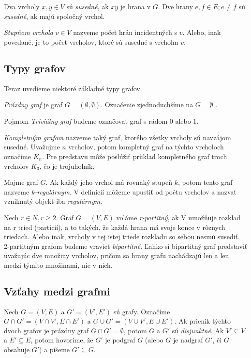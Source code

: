 Dva vrcholy $x, y \in V$ sú  \textit{susedné}, ak $xy$ je hrana v $G$.
Dve hrany $e, f \in E; e \neq f$ sú  \textit{susedné}, ak majú spoločný vrchol.\newline

\textit{Stupňom vrchola} $v \in V$ nazveme počet hrán incidentných s $v$. Alebo, inak povedané, je to počet vrcholov, ktoré sú susedné s vrcholm $v$.

\subsection{Typy grafov}

Teraz uvedieme niektoré základné typy grafov.\newline

\textit{Prázdny graf} je graf $G = (\emptyset, \emptyset)$. Označenie zjednoduchšíme na $G = \emptyset$ .\newline

Pojmom \textit{Triviálny graf} budeme označovať graf s rádom 0 alebo 1.\newline

\textit{Kompletným grafom} nazveme taký graf, ktorého všetky vrcholy sú navzájom susedné. Uvažujme $n$ vrcholov, potom kompletný graf na týchto vrcholoch označíme $K_{n}$. Pre predstavu môže poslúžiť príiklad kompletného graf troch vrcholov $K_{3}$, čo je trojuholník.\newline

Majme graf $G$. Ak každý jeho vrchol má rovnaký stupeň $k$, potom tento graf nazveme \textit{k-regulárnym}. V definícií môžeme upustiť od počtu vrcholov a nazvať vzniknutý objekt iba \textit{regulárnym}.\newline

Nech $r\in N, r\geq 2$. Graf $G = (V, E)$ voláme \textit{r-partitný}, ak V umožňuje rozklad na r tried (partícií), a to takých, že každá hrana má svoje konce v rôznych triedach. Alebo inak, vrcholy v tej istej triede rozkladu so sebou nesmú susediť. 2-partitným grafom budeme vravieť \textit{bipartitné}. Ľahko si bipartitný graf predstaviť uvažujúc dve množiny vrcholov, pričom sa hrany grafu nachádzajú len a len medzi týmito množinami, nie v nich.

\subsection{Vzťahy medzi grafmi}

Nech $G = (V, E)$ a $G' = (V', E')$ sú grafy. Označíme $G\cap G' = (V\cap V', E\cap E')$ a $G\cup G' = (V\cup V', E\cup E')$. Ak prienik týchto dvoch grafov je prázdny graf $G\cap G' = \emptyset$, potom $G$ a $G'$ sú \textit{disjunktné}. Ak $V'\subseteq V$ a $E'\subseteq E$, potom hovoríme, že $G'$ je podgraf $G$ (alebo $G$ je nadgraf $G'$, či $G$ obsahuje $G'$) a píšeme $G'\subseteq G$.\newline

